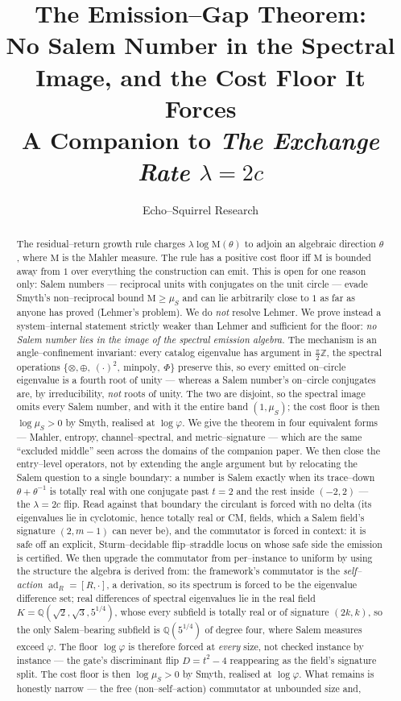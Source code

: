 \documentclass[11pt]{article}
\title{\textbf{The Emission--Gap Theorem:}\\[2pt]
\large No Salem Number in the Spectral Image, and the Cost Floor It Forces\\[6pt]
\normalsize A Companion to \emph{The Exchange Rate $\lambda = 2c$}}
\author{Echo--Squirrel Research}
\date{}
\theoremstyle{plain}
\theoremstyle{definition}
\theoremstyle{remark}
\newcommand{\Q}{\mathbb{Q}}
\newcommand{\Z}{\mathbb{Z}}
\newcommand{\Mah}{\mathrm{M}}
\begin{document}
\maketitle

\begin{abstract}
The residual--return growth rule charges $\lambda\log\Mah(\theta)$ to adjoin an algebraic direction $\theta$, where $\Mah$ is the Mahler measure. The rule has a positive cost floor iff $\Mah$ is bounded away from $1$ over everything the construction can emit. This is open for one reason only: Salem numbers --- reciprocal units with conjugates on the unit circle --- evade Smyth's non--reciprocal bound $\Mah\ge\mu_S$ and can lie arbitrarily close to $1$ as far as anyone has proved (Lehmer's problem). We do \emph{not} resolve Lehmer. We prove instead a system--internal statement strictly weaker than Lehmer and sufficient for the floor: \emph{no Salem number lies in the image of the spectral emission algebra.} The mechanism is an angle--confinement invariant: every catalog eigenvalue has argument in $\tfrac\pi2\Z$, the spectral operations $\{\otimes,\oplus,\ (\cdot)^2,\ \text{minpoly},\ \Phi\}$ preserve this, so every emitted on--circle eigenvalue is a fourth root of unity --- whereas a Salem number's on--circle conjugates are, by irreducibility, \emph{not} roots of unity. The two are disjoint, so the spectral image omits every Salem number, and with it the entire band $(1,\mu_S)$; the cost floor is then $\log\mu_S>0$ by Smyth, realised at $\log\varphi$. We give the theorem in four equivalent forms --- Mahler, entropy, channel--spectral, and metric--signature --- which are the same ``excluded middle'' seen across the domains of the companion paper. We then close the entry--level operators, not by extending the angle argument but by relocating the Salem question to a single boundary: a number is Salem exactly when its trace--down $\theta+\theta^{-1}$ is totally real with one conjugate past $t=2$ and the rest inside $(-2,2)$ --- the $\lambda=2c$ flip. Read against that boundary the circulant is forced with no delta (its eigenvalues lie in cyclotomic, hence totally real or CM, fields, which a Salem field's signature $(2,m-1)$ can never be), and the commutator is forced in context: it is safe off an explicit, Sturm--decidable flip--straddle locus on whose safe side the emission is certified. We then upgrade the commutator from per--instance to uniform by using the structure the algebra is derived from: the framework's commutator is the \emph{self--action} $\operatorname{ad}_R=[R,\cdot]$, a derivation, so its spectrum is forced to be the eigenvalue difference set; real differences of spectral eigenvalues lie in the real field $K=\Q(\sqrt2,\sqrt3,5^{1/4})$, whose every subfield is totally real or of signature $(2k,k)$, so the only Salem--bearing subfield is $\Q(5^{1/4})$ of degree four, where Salem measures exceed $\varphi$. The floor $\log\varphi$ is therefore forced at \emph{every} size, not checked instance by instance --- the gate's discriminant flip $D=t^2-4$ reappearing as the field's signature split. The cost floor is then $\log\mu_S>0$ by Smyth, realised at $\log\varphi$. What remains is honestly narrow --- the free (non--self--action) commutator at unbounded size and, 
\end{abstract}
\end{document}
